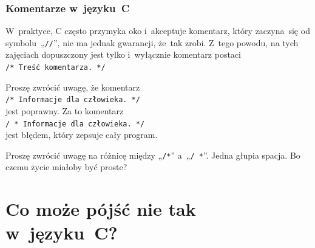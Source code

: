 \documentclass[10pt,t]{beamer}
\begin{document}
\begin{frame}
  \frametitle{Komentarze w~języku~C}


  W~praktyce, C często przymyka oko i~akceptuje komentarz, który zaczyna~się
  od symbolu~„\texttt{//}”, \alert{nie} ma jednak gwarancji, że~tak zrobi.
  Z~tego powodu, na tych zajęciach dopuszczony jest tylko i~wyłącznie
  komentarz postaci \\
  \texttt{/* Treść komentarza. */}

  Proszę zwrócić uwagę, że komentarz \\
  \texttt{/* Informacje dla człowieka. */} \\
  jest poprawny. Za to komentarz \\
  \texttt{/ * Informacje dla człowieka. */} \\
  jest błędem, który zepsuje cały program.

  Proszę zwrócić uwagę na różnicę między „\texttt{/*}” a~„\texttt{/ *}”.
  Jedna głupia spacja. Bo czemu życie miałoby być proste?

\end{frame}










\section{Co może pójść nie tak w~języku~C?}
\end{document}
